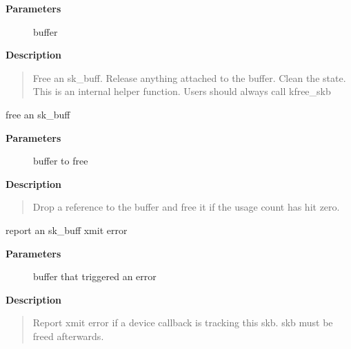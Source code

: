 \documentclass[a4paper,8pt,english]{sphinxmanual}
\begin{document}
\textbf{Parameters}
\begin{description}
\item[{}] \leavevmode
buffer

\end{description}

\textbf{Description}
\begin{quote}

Free an sk\_buff. Release anything attached to the buffer.
Clean the state. This is an internal helper function. Users should
always call kfree\_skb
\end{quote}

\begin{fulllineitems}
\label{networking/kapi:c.kfree_skb}
free an sk\_buff

\end{fulllineitems}


\textbf{Parameters}
\begin{description}
\item[{}] \leavevmode
buffer to free

\end{description}

\textbf{Description}
\begin{quote}

Drop a reference to the buffer and free it if the usage count has
hit zero.
\end{quote}

\begin{fulllineitems}
\label{networking/kapi:c.skb_tx_error}
report an sk\_buff xmit error

\end{fulllineitems}


\textbf{Parameters}
\begin{description}
\item[{}] \leavevmode
buffer that triggered an error

\end{description}

\textbf{Description}
\begin{quote}

Report xmit error if a device callback is tracking this skb.
skb must be freed afterwards.
\end{quote}
\end{document}
